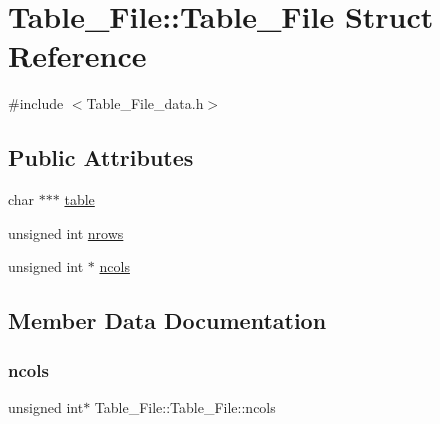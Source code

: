 \hypertarget{struct_table___file_1_1_table___file}{}\section{Table\+\_\+\+File\+:\+:Table\+\_\+\+File Struct Reference}
\label{struct_table___file_1_1_table___file}


{\ttfamily \#include $<$Table\+\_\+\+File\+\_\+data.\+h$>$}

\subsection*{Public Attributes}
\begin{DoxyCompactItemize}
\item 
char $\ast$$\ast$$\ast$ \mbox{\hyperlink{struct_table___file_1_1_table___file_ab7208b87466a87a39c72659de46e37d2}{table}}
\item 
unsigned int \mbox{\hyperlink{struct_table___file_1_1_table___file_a1b10bd035c383e065c2b3b15bd2ad9ee}{nrows}}
\item 
unsigned int $\ast$ \mbox{\hyperlink{struct_table___file_1_1_table___file_aee749d5defedfcd6b658c9968640d7c5}{ncols}}
\end{DoxyCompactItemize}


\subsection{Member Data Documentation}
\mbox{\label{struct_table___file_1_1_table___file_aee749d5defedfcd6b658c9968640d7c5}} 
\subsubsection{\texorpdfstring{ncols}{ncols}}
{\footnotesize\ttfamily unsigned int$\ast$ Table\+\_\+\+File\+::\+Table\+\_\+\+File\+::ncols}

\mbox{\label{struct_table___file_1_1_table___file_a1b10bd035c383e065c2b3b15bd2ad9ee}} 
